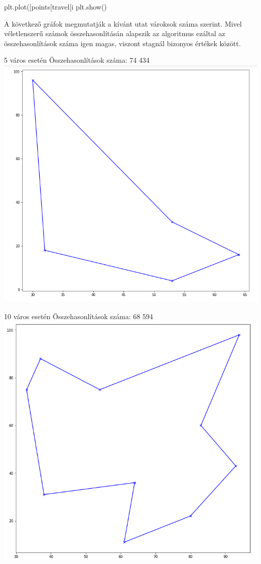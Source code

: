 \begin{python}
plt.plot([points[travel[i %
plt.show()
\end{python}

A következő gráfok megmutatják a kívánt utat vároksok száma szerint. Mivel véletlenszerű számok összehasonlításán alapszik az algoritmus ezáltal az összehasonlítások száma igen magas, viszont stagnál bizonyos értékek között.


5 város esetén
Összehasonlítások száma: 74 434
\includegraphics[scale=0.4]{images/5.png}

10 város esetén
Összehasonlítások száma: 68 594
\includegraphics[scale=0.4]{images/10.png}

